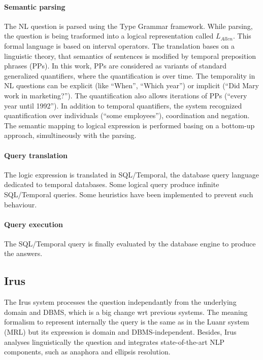 \documentclass[10pt,journal,letterpaper,compsoc]{IEEEtran}
\begin{document}
\paragraph{Semantic parsing}
The NL question is parsed using the Type Grammar framework. While parsing, the
question is being trasformed into a logical representation called $L_{Allen}$.
This formal language is based on interval operators. 
The translation bases on a linguistic theory, that semantics of sentences is
modified by temporal preposition phrases (PPs). 
In this work, PPs are considered as variants of standard generalized
quantifiers, where the quantification is over time. 
The temporality in NL questions can be explicit (like ``When'', ``Which year'')
or implicit (``Did Mary work in marketing?''). 
The quantification also allows iterations of PPs (``every year until 1992''). 
In addition to temporal quantifiers, the system recognized quantification over
individuals (``some employees''), coordination and negation.
The semantic mapping to logical expression is performed basing on a bottom-up
approach, simultineously with the parsing. 



\paragraph{Query translation}
The logic expression is translated in SQL/Temporal, the database query language
dedicated to temporal databases. 
Some logical query produce infinite SQL/Temporal queries. Some heuristics have
been implemented to prevent such behaviour. 


\paragraph{Query execution}
The SQL/Temporal query is finally evaluated by the database engine to produce
the answers. 




\subsection{{\sc Irus}~\cite{Bates:1983:IRU:511793.511804}}
The {\sc Irus} system processes the question independantly from the underlying
domain and DBMS, which is a big change wrt previous systems.
The meaning formalism to represent internally the query is the same as in the
{\sc Luanr} system (MRL) but its expression is domain and DBMS-independent.
Besides, {\sc Irus} analyses linguistically the question and integrates
state-of-the-art NLP components, such as anaphora and ellipsis resolution.
\end{document}
